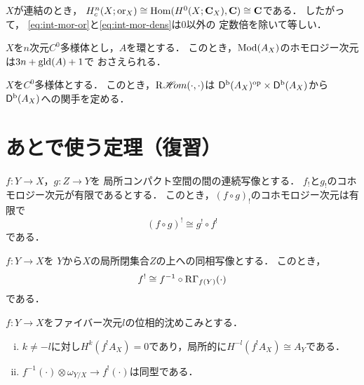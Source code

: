 \(X\)が連結のとき，
\(H^n_c(X;\mathord{\mathrm{or}}_X)\cong\mathop{\mathrm{Hom}}\nolimits(H^0(X;\mathbf{C}_X),\mathbf{C})\cong\mathbf{C}\)である．
したがって，
\eqref{eq:int-mor-or}と\eqref{eq:int-mor-dens}は\(0\)以外の
定数倍を除いて等しい．

\begin{PRP}[{\cite[Proposition 3.3.11]{KS90}}]\label{3311}
    \(X\)を\(n\)次元\(C^0\)多様体とし，\(A\)を環とする．
    このとき，\(\mathop{\mathrm{Mod}}\nolimits(A_X)\)のホモロジー次元は\(3n+\mathop{\mathrm{gld}}\nolimits(A)+1\)で
    おさえられる．
\end{PRP}

\begin{CRL}[{\cite[Corollary 3.3.12]{KS90}}]\label{3312}
    \(X\)を\(C^0\)多様体とする．
    このとき，\(\mathop{\mathrm{R}\hspace{-1.5pt}\mathop{\mathscr{H}\hspace{-2pt}om}\nolimits}\nolimits(\cdot,\cdot)\)は
    \(\mathop{\mathsf{D}^\mathrm{b}}\nolimits(A_X)^{{\rm op}}\times\mathop{\mathsf{D}^\mathrm{b}}\nolimits(A_X)\)から
    \(\mathop{\mathsf{D}^\mathrm{b}}\nolimits(A_X)\)への関手を定める．
\end{CRL}






\appendix

\section{あとで使う定理（復習）}
\begin{leftbar}
\begin{PRP}[{\cite[Proposition 3.1.8]{KS90}}]\label{PRP318}
    \(f\colon Y\to X\)，\(g\colon Z\to Y\)を
    局所コンパクト空間の間の連続写像とする．
    \(f_!\)と\(g_!\)のコホモロジー次元が有限であるとする．
    このとき，\((f\circ g)_!\)のコホモロジー次元は有限で
    \[
        (f\circ g)^!\cong g^!\circ f^!
    \]である．
\end{PRP}
\end{leftbar}
\begin{leftbar}
    \begin{PRP}[{\cite[Proposition 3.1.12]{KS90}}]\label{PRP3112}
        \(f\colon Y\to X\)を
        \(Y\)から\(X\)の局所閉集合\(Z\)の上への同相写像とする．
        このとき，
        \[
            f^!\cong f^{-1}\circ \mathop{\mathrm{R}\hspace{-0pt}\Gamma}\nolimits_{f(Y)}(\cdot)
        \]である．
    \end{PRP}
\end{leftbar}

\begin{leftbar}
    \begin{PRP}[{\cite[Proposition 3.3.2]{KS90}}]\label{PRP332}
        \(f\colon Y\to X\)をファイバー次元\(l\)の位相的沈めこみとする．
        \begin{enumerate}[(i)]
            \item \(k\ne -l\)に対し\(H^k(f^!A_X)=0\)であり，局所的に\(H^{-l}(f^!A_X)\cong A_Y\)である．
            \item \(f^{-1}(\cdot)\otimes\omega_{Y/X}\to f^!(\cdot)\)は同型である．\label{332-2}
        \end{enumerate}
    \end{PRP}    
\end{leftbar}
